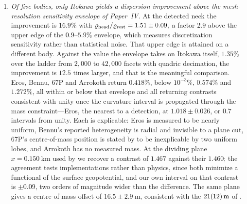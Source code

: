 \begin{enumerate}
\item \emph{Of five bodies, only Itokawa yields a dispersion improvement
above the mesh-resolution sensitivity envelope of Paper~IV.} At the
detected neck the improvement is $16.9\%$ with
$\varrho_{\mathrm{head}}/\varrho_{\mathrm{rest}} = 1.51 \pm 0.09$, a factor $2.9$ above the upper
edge of the $0.9$--$5.9\%$ envelope, which measures discretization
sensitivity rather than statistical noise. That upper edge is attained on
a different body. Against the value the envelope takes on Itokawa itself,
$1.35\%$ over the ladder from $2{,}000$ to $42{,}000$ facets with quadric
decimation, the improvement is $12.5$ times larger, and that is the
meaningful comparison.
Eros, Bennu, 67P and Arrokoth return $0.418\%$, below $10^{-3}\%$,
$0.574\%$ and $1.272\%$, all within or below that envelope and all
returning contrasts consistent with unity once the curvature interval is
propagated through the mass constraint---Eros, the nearest to a
detection, at $1.018 \pm 0.026$, or $0.7$ intervals from unity. Each is
explicable: Eros is measured to be nearly uniform, Bennu's reported
heterogeneity is radial and invisible to a plane cut, 67P's
centre-of-mass position is stated by \citet{jorda2016} to be inexplicable
by two uniform lobes, and Arrokoth has no measured mass. At the dividing
plane $x = \SI{0.150}{\kilo\metre}$ used by \citet{kanamaru2019} we
recover a contrast of $1.467$ against their $1.460$; the agreement tests
implementations rather than physics, since both minimize a functional of
the surface geopotential, and our own interval on that contrast is
$\pm0.09$, two orders of magnitude wider than the difference. The same
plane gives a centre-of-mass offset of $16.5 \pm \SI{2.9}{\metre}$,
consistent with the $\SI{21+-12}{\metre}$ of \citet{lowry2014}.


\end{enumerate}
